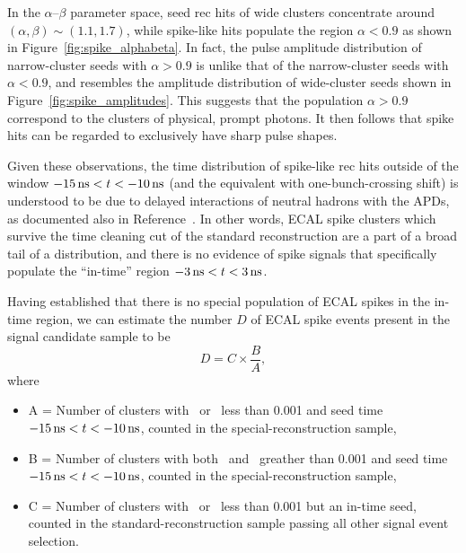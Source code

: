 In the $\alpha$--$\beta$ parameter space, seed rec hits of wide clusters concentrate around $(\alpha, \beta) \sim (1.1, 1.7)$, while spike-like hits populate the region $\alpha < 0.9$ as shown in Figure~\ref{fig:spike_alphabeta}.
In fact, the pulse amplitude distribution of narrow-cluster seeds with $\alpha > 0.9$ is unlike that of the narrow-cluster seeds with $\alpha < 0.9$, and resembles the amplitude distribution of wide-cluster seeds shown in Figure~\ref{fig:spike_amplitudes}.
This suggests that the population $\alpha > 0.9$ correspond to the clusters of physical, prompt photons.
It then follows that spike hits can be regarded to exclusively have sharp pulse shapes.

Given these observations, the time distribution of spike-like rec hits outside of the window $-15\, \text{ns} < t < -10\, \text{ns}$ (and the equivalent with one-bunch-crossing shift) is understood to be due to delayed interactions of neutral hadrons with the APDs, as documented also in Reference~\cite{CMS_AN_2010-357}. 
In other words, ECAL spike clusters which survive the time cleaning cut of the standard reconstruction are a part of a broad tail of a distribution, and there is no evidence of spike signals that specifically populate the ``in-time'' region $-3\, \text{ns} < t < 3\, \text{ns}$.

Having established that there is no special population of ECAL spikes in the in-time region, we can estimate the number $D$ of ECAL spike events present in the signal candidate sample to be
\begin{equation}
  D = C \times \frac{B}{A},
\end{equation}
where
\begin{itemize}
  \item A = Number of clusters with \sieie\ or \sipip\ less than 0.001 and seed time $-15\, \text{ns} < t < -10\, \text{ns}$, counted in the special-reconstruction sample,
  \item B = Number of clusters with both \sieie\ and \sipip\ greather than 0.001 and seed time $-15\, \text{ns} < t < -10\, \text{ns}$, counted in the special-reconstruction sample, 
  \item C = Number of clusters with \sieie\ or \sipip\ less than 0.001 but an in-time seed, counted in the standard-reconstruction sample passing all other signal event selection.
\end{itemize}

